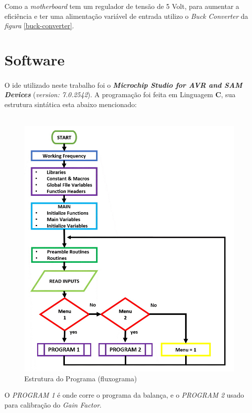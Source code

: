 Como a \textit{motherboard} tem um regulador de tensão de 5 Volt, para aumentar a eficiência  e ter uma alimentação variável de entrada utilizo o \textit{Buck Converter} da \textit{figura} \ref{buck-converter}.
\chapter{Software}
O \ac{ide} utilizado neste trabalho foi o \textbf{\textit{{Microchip Studio for AVR\textsuperscript{\textregistered} and SAM Devices}}} (\textit{version: 7.0.2542}). A programação foi feita em Linguagem \textbf{C}, sua estrutura sintática esta abaixo mencionado:
\\
\\
\begin{figure}[H]
	\centering
	\includegraphics[scale=0.6]{./image/PESTA/flowchart/Main_Program_1.jpg}
	\caption{Estrutura do Programa (fluxograma)}
	\label{Main_Program_1}
\end{figure}
O \textit{PROGRAM 1} é onde corre o programa da balança, e o \textit{PROGRAM 2} usado para calibração do \textit{Gain Factor}.
\\
\\
